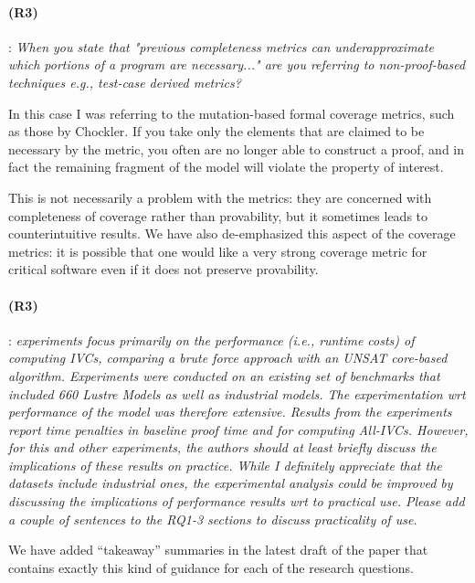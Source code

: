 \documentclass{article}
\begin{document}
\paragraph{(R3)}: \textit{When you state that "previous completeness metrics can underapproximate which portions of a program are necessary..." are you referring to non-proof-based techniques e.g., test-case derived metrics?}
\vspace{0.05in}

In this case I was referring to the mutation-based formal coverage metrics, such as those by Chockler.  If you take only the elements that are claimed to be necessary by the metric, you often are no longer able to construct a proof, and in fact the remaining fragment of the model will violate the property of interest.

This is not necessarily a problem with the metrics: they are concerned with completeness of coverage rather than provability, but it sometimes leads to counterintuitive results.  We have also de-emphasized this aspect of the coverage metrics: it is possible that one would like a very strong coverage metric for critical software even if it does not preserve provability.

\paragraph{(R3)}: \textit{experiments focus primarily on the performance (i.e., runtime costs) of computing IVCs, comparing a brute force approach with an UNSAT core-based algorithm. Experiments were conducted on an existing set of benchmarks that included 660 Lustre Models as well as industrial models. The experimentation wrt performance of the model was therefore extensive. Results from the experiments report time penalties in baseline proof time and for computing All-IVCs. However, for this and other experiments, the authors should at least briefly discuss the implications of these results on practice. While I definitely appreciate that the datasets include industrial ones, the experimental analysis could be improved by discussing the implications of performance results wrt to practical use. Please add a couple of sentences to the RQ1-3 sections to discuss practicality of use.}
\vspace{0.05in}

We have added ``takeaway'' summaries in the latest draft of the paper that contains exactly this kind of guidance for each of the research questions.
\end{document}
